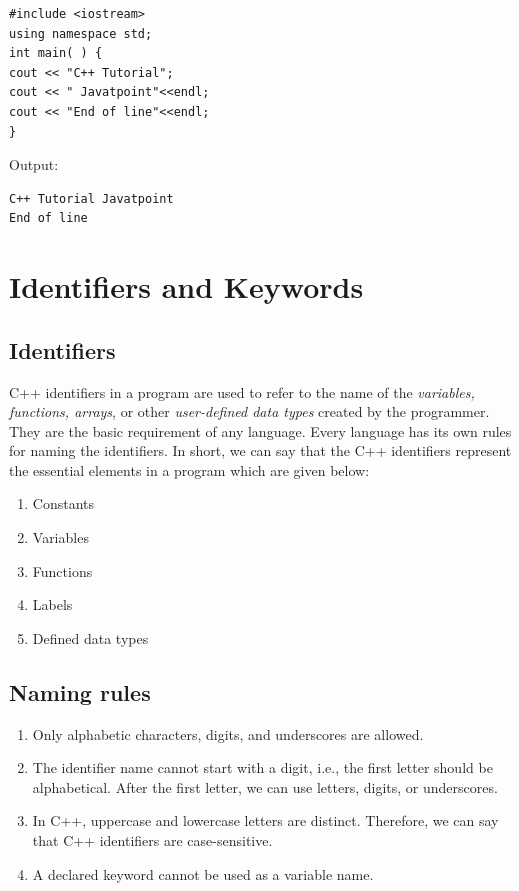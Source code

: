 \documentclass{book}
\begin{document}
\begin{verbatim}
#include <iostream>  
using namespace std;  
int main( ) {  
cout << "C++ Tutorial";     
cout << " Javatpoint"<<endl;   
cout << "End of line"<<endl;   
}   
\end{verbatim}

Output:
\begin{verbatim}
C++ Tutorial Javatpoint 
End of line
\end{verbatim}

\section{Identifiers and Keywords}

\subsection{Identifiers}

C++ identifiers in a program are used to refer to the name of the \emph{variables, functions, arrays}, or other \emph{user-defined data types} created by the programmer. They are the basic requirement of any language. Every language has its own rules for naming the identifiers. In short, we can say that the C++ identifiers represent the essential elements in a program which are given below:

\begin{enumerate}
	\item Constants
\item Variables
\item Functions
\item Labels
\item Defined data types
\end{enumerate}

\subsection{Naming rules}

\begin{enumerate}
	\item Only alphabetic characters, digits, and underscores are allowed.
\item The identifier name cannot start with a digit, i.e., the first letter should be alphabetical. After the first letter, we can use letters, digits, or underscores.
\item In C++, uppercase and lowercase letters are distinct. Therefore, we can say that C++ identifiers are case-sensitive.
\item A declared keyword cannot be used as a variable name.
\end{enumerate}
\end{document}
